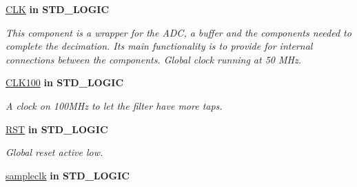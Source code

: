  \begin{DoxyCompactItemize}
\item 
\hypertarget{classADC__TOP_a9a17c21e2258ab6c61274f510b7ec756}{\hyperlink{classADC__TOP_a9a17c21e2258ab6c61274f510b7ec756}{C\-L\-K}  {\bfseries {\bfseries \textcolor{vhdlkeyword}{in}\textcolor{vhdlchar}{ }}} {\bfseries \textcolor{comment}{S\-T\-D\-\_\-\-L\-O\-G\-I\-C}\textcolor{vhdlchar}{ }} }\label{classADC__TOP_a9a17c21e2258ab6c61274f510b7ec756}

\begin{DoxyCompactList}\small\item\em This component is a wrapper for the A\-D\-C, a buffer and the components needed to complete the decimation. Its main functionality is to provide for internal connections between the components. Global clock running at 50 M\-Hz. \end{DoxyCompactList}\item 
\hypertarget{classADC__TOP_ab1f7becce7cb29d94bb2f2ec187f72a4}{\hyperlink{classADC__TOP_ab1f7becce7cb29d94bb2f2ec187f72a4}{C\-L\-K100}  {\bfseries {\bfseries \textcolor{vhdlkeyword}{in}\textcolor{vhdlchar}{ }}} {\bfseries \textcolor{comment}{S\-T\-D\-\_\-\-L\-O\-G\-I\-C}\textcolor{vhdlchar}{ }} }\label{classADC__TOP_ab1f7becce7cb29d94bb2f2ec187f72a4}

\begin{DoxyCompactList}\small\item\em A clock on 100\-M\-Hz to let the filter have more taps. \end{DoxyCompactList}\item 
\hypertarget{classADC__TOP_a91cf794d165cc0a740042335a6062940}{\hyperlink{classADC__TOP_a91cf794d165cc0a740042335a6062940}{R\-S\-T}  {\bfseries {\bfseries \textcolor{vhdlkeyword}{in}\textcolor{vhdlchar}{ }}} {\bfseries \textcolor{comment}{S\-T\-D\-\_\-\-L\-O\-G\-I\-C}\textcolor{vhdlchar}{ }} }\label{classADC__TOP_a91cf794d165cc0a740042335a6062940}

\begin{DoxyCompactList}\small\item\em Global reset active low. \end{DoxyCompactList}\item 
\hypertarget{classADC__TOP_a4696bc4e06c727fae1b8ce3ba8cf08d4}{\hyperlink{classADC__TOP_a4696bc4e06c727fae1b8ce3ba8cf08d4}{sampleclk}  {\bfseries {\bfseries \textcolor{vhdlkeyword}{in}\textcolor{vhdlchar}{ }}} {\bfseries \textcolor{comment}{S\-T\-D\-\_\-\-L\-O\-G\-I\-C}\textcolor{vhdlchar}{ }} }\label{classADC__TOP_a4696bc4e06c727fae1b8ce3ba8cf08d4}


\end{DoxyCompactItemize}
